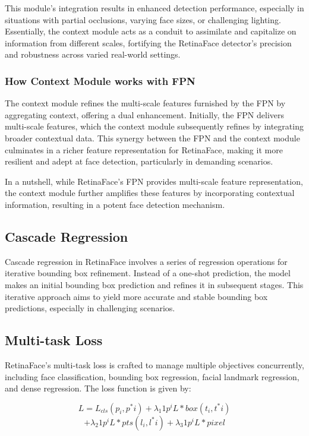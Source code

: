 \documentclass{article}
\begin{document}
This module's integration results in enhanced detection performance, especially in situations with partial occlusions, varying face sizes, or challenging lighting. Essentially, the context module acts as a conduit to assimilate and capitalize on information from different scales, fortifying the RetinaFace detector's precision and robustness across varied real-world settings.

\subsubsection{How Context Module works with FPN}

The context module refines the multi-scale features furnished by the FPN by aggregating context, offering a dual enhancement. Initially, the FPN delivers multi-scale features, which the context module subsequently refines by integrating broader contextual data. This synergy between the FPN and the context module culminates in a richer feature representation for RetinaFace, making it more resilient and adept at face detection, particularly in demanding scenarios.

In a nutshell, while RetinaFace's FPN provides multi-scale feature representation, the context module further amplifies these features by incorporating contextual information, resulting in a potent face detection mechanism.
\subsection{Cascade Regression}

Cascade regression in RetinaFace involves a series of regression operations for iterative bounding box refinement. Instead of a one-shot prediction, the model makes an initial bounding box prediction and refines it in subsequent stages. This iterative approach aims to yield more accurate and stable bounding box predictions, especially in challenging scenarios.

\subsection{Multi-task Loss}

RetinaFace's multi-task loss is crafted to manage multiple objectives concurrently, including face classification, bounding box regression, facial landmark regression, and dense regression. The loss function is given by:

\[ L = L_{cls}(p_i, p^*i) + \lambda_1 1{p^i} L*{box}(t_i, t^*i) \]
\[+ \lambda_2 1{p^i} L*{pts}(l_i, l^*i) + \lambda_3 1{p^i} L*{pixel} \]
\end{document}
